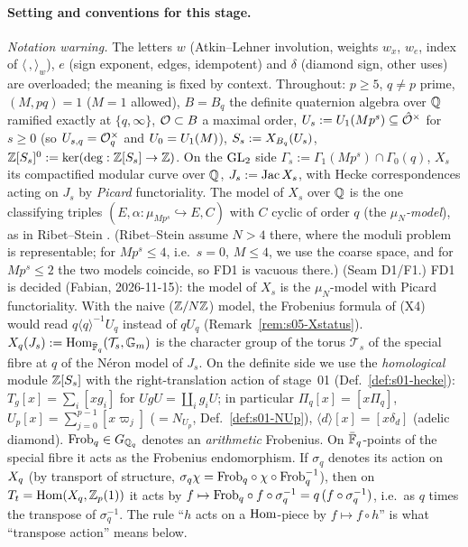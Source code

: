 \paragraph{Setting and conventions for this stage.}
\emph{Notation warning.} The letters $w$ (Atkin--Lehner involution, weights $w_x$, $w_e$, index of $\langle\,,\rangle_w$), $e$ (sign exponent, edges, idempotent) and $\delta$ (diamond sign, other uses) are overloaded; the meaning is fixed by context.
Throughout: $p\ge5$, $q\ne p$ prime, $(M,pq)=1$ ($M=1$ allowed), $B=B_q$ the definite quaternion algebra over $\mathbb{Q}$ ramified
exactly at $\{q,\infty\}$, $\mathcal{O}\subset B$ a maximal order, $U_s:=U_1(Mp^s)\subseteq\hat{\mathcal{O}}^\times$ for $s\ge0$ (so $U_{s,q}=\mathcal{O}_q^\times$
and $U_0=U_1(M)$), $S_s:=X_{B_q}(U_s)$, $\mathbb{Z}[S_s]^0:=\ker(\deg:\mathbb{Z}[S_s]\to\mathbb{Z})$. On the $\mathrm{GL}_2$ side
$\Gamma_s:=\Gamma_1(Mp^s)\cap\Gamma_0(q)$, $X_s$ its compactified modular curve over $\mathbb{Q}$, $J_s:=\operatorname{Jac} X_s$, with Hecke
correspondences acting on $J_s$ by \emph{Picard} functoriality. The model of $X_s$ over $\mathbb{Q}$ is the one classifying triples
$(E,\alpha:\mu_{Mp^s}\hookrightarrow E,C)$ with $C$ cyclic of order $q$ (the \emph{$\mu_N$-model}), as in Ribet--Stein
. (Ribet--Stein assume $N>4$ there, where the moduli problem is representable; for
$Mp^s\le4$, i.e.\ $s=0$, $M\le4$, we use the coarse space, and for $Mp^s\le2$ the two models coincide, so FD1 is vacuous there.)
(Seam D1/F1.) FD1 is decided (Fabian, 2026-11-15): the model of $X_s$ is the $\mu_N$-model with Picard functoriality. With the naive ($\mathbb{Z}/N\mathbb{Z}$) model, the Frobenius formula of (X4) would read
$q\langle q\rangle^{-1}U_q$ instead of $qU_q$ (Remark~\ref{rem:s05-Xstatus}).
$X_q(J_s):=\operatorname{Hom}_{\bar{\mathbb{F}}_q}(\mathcal T_s,\mathbb G_m)$ is the character group of the torus $\mathcal T_s$ of the special fibre at $q$ of the
Néron model of $J_s$. On the definite side we use the \emph{homological} module $\mathbb{Z}[S_s]$ with the right-translation action of
stage~01 (Def.~\ref{def:s01-hecke}): $T_g[x]=\sum_i[xg_i]$ for $UgU=\coprod_ig_iU$; in particular $\Pi_q[x]=[x\Pi_q]$,
$U_p[x]=\sum_{j=0}^{p-1}[x\varpi_j]$ ($=N_{U_p}$, Def.~\ref{def:s01-NUp}), $\langle d\rangle[x]=[x\delta_d]$ (adelic diamond).
$\mathrm{Frob}_q\in G_{\mathbb{Q}_q}$ denotes an \emph{arithmetic} Frobenius. On $\bar{\mathbb{F}}_q$-points of the special fibre it acts as the Frobenius
endomorphism. If $\sigma_q$ denotes its action on $X_q$ (by transport of structure, $\sigma_q\chi=\mathrm{Frob}_q\circ\chi\circ\mathrm{Frob}_q^{-1}$), then on
$T_t=\operatorname{Hom}(X_q,\mathbb{Z}_p(1))$ it acts by $f\mapsto\mathrm{Frob}_q\circ f\circ\sigma_q^{-1}=q\,(f\circ\sigma_q^{-1})$, i.e.\ as $q$ times the transpose of
$\sigma_q^{-1}$. The rule ``$h$ acts on a $\operatorname{Hom}$-piece by $f\mapsto f\circ h$'' is what ``transpose action'' means below.

